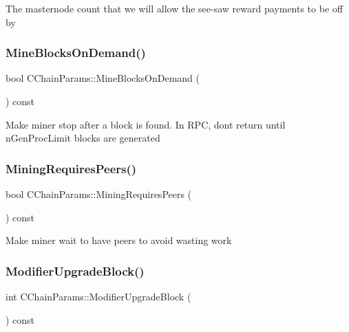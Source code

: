 The masternode count that we will allow the see-\/saw reward payments to be off by \mbox{\label{class_c_chain_params_a96be31ff3d8525c9d5458b7d07ada6bb}} 
\subsubsection{\texorpdfstring{MineBlocksOnDemand()}{MineBlocksOnDemand()}}
{\footnotesize\ttfamily bool C\+Chain\+Params\+::\+Mine\+Blocks\+On\+Demand (\begin{DoxyParamCaption}{ }\end{DoxyParamCaption}) const\hspace{0.3cm}{\ttfamily [inline]}}

Make miner stop after a block is found. In R\+PC, don\textquotesingle{}t return until n\+Gen\+Proc\+Limit blocks are generated \mbox{\label{class_c_chain_params_a066ad4166984a31bdc0836193a6341ee}} 
\subsubsection{\texorpdfstring{MiningRequiresPeers()}{MiningRequiresPeers()}}
{\footnotesize\ttfamily bool C\+Chain\+Params\+::\+Mining\+Requires\+Peers (\begin{DoxyParamCaption}{ }\end{DoxyParamCaption}) const\hspace{0.3cm}{\ttfamily [inline]}}

Make miner wait to have peers to avoid wasting work \mbox{\label{class_c_chain_params_ad166dbdd9631958fa0126e13dec1630a}} 
\subsubsection{\texorpdfstring{ModifierUpgradeBlock()}{ModifierUpgradeBlock()}}
{\footnotesize\ttfamily int C\+Chain\+Params\+::\+Modifier\+Upgrade\+Block (\begin{DoxyParamCaption}{ }\end{DoxyParamCaption}) const\hspace{0.3cm}{\ttfamily [inline]}}

